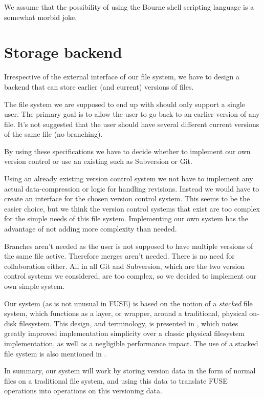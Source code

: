 \documentclass[12pt]{article}
\begin{document}
We assume that the possibility of using the Bourne shell scripting
language is a somewhat morbid joke.
 
\section{Storage backend}

Irrespective of the external interface of our file system, we have to
design a backend that can store earlier (and current) versions of
files.

The file system we are supposed to end up with should only support a
single user.  The primary goal is to allow the user to go back to an
earlier version of any file. It's not suggested that the user should
have several different current versions of the same file (no
branching).

By using these specifications we have to decide whether to implement
our own version control or use an existing such as Subversion or
Git\cite{Grant:2009ly}.

Using an already existing version control system we not have to
implement any actual data-compression or logic for handling revisions.
Instead we would have to create an interface for the chosen version
control system. This seems to be the easier choice, but we think the
version control systems that exist are too complex for the simple
needs of this file system. Implementing our own system has the
advantage of not adding more complexity than needed.

Branches aren't needed as the user is not supposed to have multiple
versions of the same file active. Therefore merges aren't needed.
There is no need for collaboration either. All in all Git and
Subversion, which are the two version control systems we considered,
are too complex, so we decided to implement our own simple system.

Our system (as is not unusual in FUSE) is based on the notion of a
\textit{stacked} file system, which functions as a layer, or wrapper,
around a traditional, physical on-disk filesystem.  This design, and
terminology, is presented in \cite{1096690}, which notes greatly
improved implementation simplicity over a classic physical filesystem
implementation, as well as a negligible performance impact.  The use
of a stacked file system is also mentioned in
\cite{Bustamante04wayback:a}.

In summary, our system will work by storing version data in the form
of normal files on a traditional file system, and using this data to
translate FUSE operations into operations on this versioning data.
 
\end{document}
